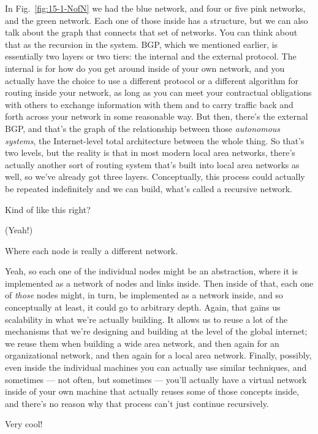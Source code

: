 \rrr In Fig.~\ref{fig:15-1-NofN} we had the blue network, and four or five pink networks, and the green network. Each one of those inside has a structure, but we can also talk about the graph that connects that set of networks. You can think about that as the recursion in the system. BGP, which we mentioned earlier, is essentially two layers or two tiers: the internal and the external protocol. The internal is for how do you get around inside of your own network, and you actually have the choice to use a different protocol or a different algorithm for routing inside your network, as long as you can meet your contractual obligations with others to exchange information with them and to carry traffic back and forth across your network in some reasonable way. But then, there's the external BGP, and that's the graph of the relationship between those \emph{autonomous systems}, the Internet-level total architecture between the whole thing. So that's two levels, but the reality is that in most modern local area networks, there's actually another sort of routing system that's built into local area networks as well, so we've already got three layers. Conceptually, this process could actually be repeated indefinitely and we can build, what's called a recursive network.

\mmm Kind of like this right? 

\rrr (Yeah!) 

\mmm Where each node is really a different network.

\rrr Yeah, so each one of the individual nodes might be an abstraction, where it is implemented as a network of nodes and links inside. Then inside of that, each one of \emph{those} nodes might, in turn, be implemented as a network inside, and so conceptually at least, it could go to arbitrary depth. Again, that gains us scalability in what we're actually building. It allows us to reuse a lot of the mechanisms that we're designing and building at the level of the global internet; we reuse them when building a wide area network, and then again for an organizational network, and then again for a local area network. Finally, possibly, even inside the individual machines you can actually use similar techniques, and sometimes --- not often, but sometimes --- you'll actually have a virtual network inside of your own machine that actually reuses some of those concepts inside, and there's no reason why that process can't just continue recursively.

\mmm Very cool!

